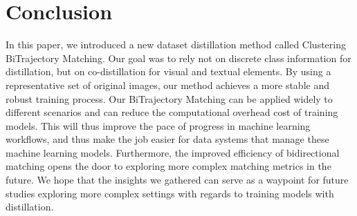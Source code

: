 \documentclass[sigconf, nonacm]{acmart}
\begin{document}
\section{Conclusion}

In this paper, we introduced a new dataset distillation method called Clustering BiTrajectory Matching. Our goal was to rely not on discrete class information for distillation, but on co-distillation for visual and textual elements. By using a representative set of original images, our method achieves a more stable and robust training process. Our BiTrajectory Matching can be applied widely to different scenarios and can reduce the computational overhead cost of training models. This will thus improve the pace of progress in machine learning workflows, and thus make the job easier for data systems that manage these machine learning models. Furthermore, the improved efficiency of bidirectional matching opens the door to exploring more complex matching metrics in the future. We hope that the insights we gathered can serve as a waypoint
for future studies exploring more complex settings with regards to training models with distillation.





\end{document}
